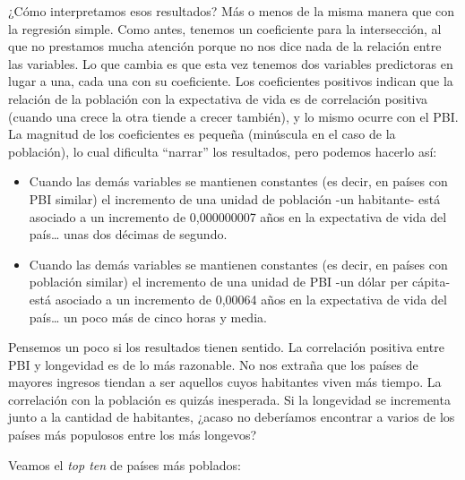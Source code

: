 \documentclass[]{book}
\newenvironment{Shaded}{\begin{snugshade}}{\end{snugshade}}
\newcommand{\KeywordTok}[1]{\textcolor[rgb]{0.13,0.29,0.53}{\textbf{#1}}}
\newcommand{\DataTypeTok}[1]{\textcolor[rgb]{0.13,0.29,0.53}{#1}}
\newcommand{\DecValTok}[1]{\textcolor[rgb]{0.00,0.00,0.81}{#1}}
\newcommand{\StringTok}[1]{\textcolor[rgb]{0.31,0.60,0.02}{#1}}
\newcommand{\OperatorTok}[1]{\textcolor[rgb]{0.81,0.36,0.00}{\textbf{#1}}}
\newcommand{\NormalTok}[1]{#1}
\providecommand{\tightlist}{%
  \setlength{\itemsep}{0pt}\setlength{\parskip}{0pt}}
\begin{document}
¿Cómo interpretamos esos resultados? Más o menos de la misma manera que
con la regresión simple. Como antes, tenemos un coeficiente para la
intersección, al que no prestamos mucha atención porque no nos dice nada
de la relación entre las variables. Lo que cambia es que esta vez
tenemos dos variables predictoras en lugar a una, cada una con su
coeficiente. Los coeficientes positivos indican que la relación de la
población con la expectativa de vida es de correlación positiva (cuando
una crece la otra tiende a crecer también), y lo mismo ocurre con el
PBI. La magnitud de los coeficientes es pequeña (minúscula en el caso de
la población), lo cual dificulta ``narrar'' los resultados, pero podemos
hacerlo así:

\begin{itemize}
\tightlist
\item
  Cuando las demás variables se mantienen constantes (es decir, en
  países con PBI similar) el incremento de una unidad de población -un
  habitante- está asociado a un incremento de 0,000000007 años en la
  expectativa de vida del país\ldots{} unas dos décimas de segundo.
\item
  Cuando las demás variables se mantienen constantes (es decir, en
  países con población similar) el incremento de una unidad de PBI -un
  dólar per cápita- está asociado a un incremento de 0,00064 años en la
  expectativa de vida del país\ldots{} un poco más de cinco horas y
  media.
\end{itemize}

Pensemos un poco si los resultados tienen sentido. La correlación
positiva entre PBI y longevidad es de lo más razonable. No nos extraña
que los países de mayores ingresos tiendan a ser aquellos cuyos
habitantes viven más tiempo. La correlación con la población es quizás
inesperada. Si la longevidad se incrementa junto a la cantidad de
habitantes, ¿acaso no deberíamos encontrar a varios de los países más
populosos entre los más longevos?

Veamos el \emph{top ten} de países más poblados:

\begin{Shaded}
\end{Shaded}
\end{document}

